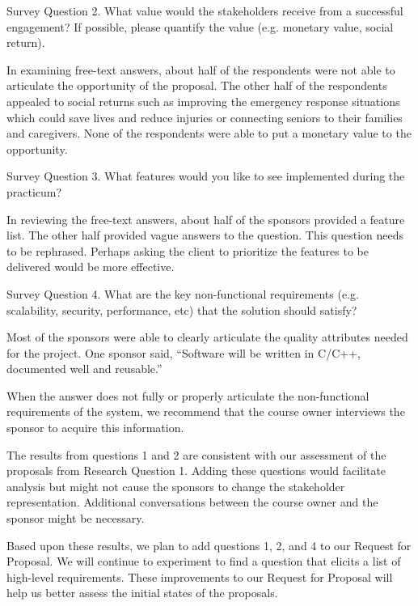 \documentclass[conference]{IEEEtran}
\begin{document}
{Survey Question 2. What value would the stakeholders receive from a successful engagement? If possible, please quantify the value (e.g. monetary
value, social return).}

In examining free-text answers, about half of the respondents were not
able to articulate the opportunity of the proposal. The other half of
the respondents appealed to social returns such as improving the
emergency response situations which could save lives and reduce injuries
or connecting seniors to their families and caregivers. None of the
respondents were able to put a monetary value to the opportunity.

{Survey Question 3. What features would you like to see implemented during the
practicum? }

In reviewing the free-text answers, about half of the sponsors provided
a feature list. The other half provided vague answers to the question.
This question needs to be rephrased. Perhaps asking the client to
prioritize the features to be delivered would be more effective.

{Survey Question 4. What are the key non-functional requirements (e.g.
scalability, security, performance, etc) that the solution should
satisfy?}

Most of the sponsors were able to clearly articulate the quality
attributes needed for the project. One sponsor said, ``Software will be
written in C/C++, documented well and reusable.'' 

When the answer does not fully or properly articulate the
non-functional requirements of the system, we recommend that the course
owner interviews the sponsor to acquire this information. 

The results from questions 1 and 2 are consistent with our assessment
of the proposals from Research Question 1. Adding these questions would
facilitate analysis but might not cause the sponsors to change the
stakeholder representation. Additional conversations between the course 
owner and the sponsor might be necessary.

Based upon these results, we plan to add questions 1, 2, and 4 to our
Request for Proposal. We will continue to experiment to find a question
that elicits a list of high-level requirements. These improvements to
our Request for Proposal will help us better assess the initial states
of the proposals.

\end{document}
